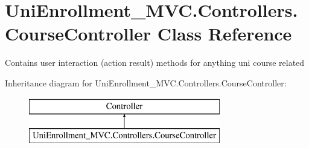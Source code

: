 \hypertarget{class_uni_enrollment___m_v_c_1_1_controllers_1_1_course_controller}{}\section{Uni\+Enrollment\+\_\+\+M\+V\+C.\+Controllers.\+Course\+Controller Class Reference}
\label{class_uni_enrollment___m_v_c_1_1_controllers_1_1_course_controller}


Contains user interaction (action result) methods for anything uni \textquotesingle{}course\textquotesingle{} related  


Inheritance diagram for Uni\+Enrollment\+\_\+\+M\+V\+C.\+Controllers.\+Course\+Controller\+:\begin{figure}[H]
\begin{center}
\leavevmode
\includegraphics[height=2.000000cm]{class_uni_enrollment___m_v_c_1_1_controllers_1_1_course_controller}
\end{center}
\end{figure}
